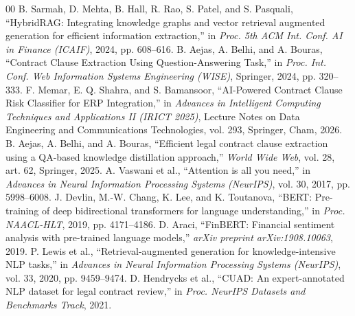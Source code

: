 \documentclass[conference]{IEEEtran}
\begin{document}
\begin{thebibliography}{00}
 B. Sarmah, D. Mehta, B. Hall, R. Rao, S. Patel, and S. Pasquali, ``HybridRAG: Integrating knowledge graphs and vector retrieval augmented generation for efficient information extraction,'' in \textit{Proc. 5th ACM Int. Conf. AI in Finance (ICAIF)}, 2024, pp. 608--616.
 B. Aejas, A. Belhi, and A. Bouras, ``Contract Clause Extraction Using Question-Answering Task,'' in \textit{Proc. Int. Conf. Web Information Systems Engineering (WISE)}, Springer, 2024, pp. 320--333.
 F. Memar, E. Q. Shahra, and S. Bamansoor, ``AI-Powered Contract Clause Risk Classifier for ERP Integration,'' in \textit{Advances in Intelligent Computing Techniques and Applications II (IRICT 2025)}, Lecture Notes on Data Engineering and Communications Technologies, vol. 293, Springer, Cham, 2026.
 B. Aejas, A. Belhi, and A. Bouras, ``Efficient legal contract clause extraction using a QA-based knowledge distillation approach,'' \textit{World Wide Web}, vol. 28, art. 62, Springer, 2025.
 A. Vaswani et al., ``Attention is all you need,'' in \textit{Advances in Neural Information Processing Systems (NeurIPS)}, vol. 30, 2017, pp. 5998--6008.
 J. Devlin, M.-W. Chang, K. Lee, and K. Toutanova, ``BERT: Pre-training of deep bidirectional transformers for language understanding,'' in \textit{Proc. NAACL-HLT}, 2019, pp. 4171--4186.
 D. Araci, ``FinBERT: Financial sentiment analysis with pre-trained language models,'' \textit{arXiv preprint arXiv:1908.10063}, 2019.
 P. Lewis et al., ``Retrieval-augmented generation for knowledge-intensive NLP tasks,'' in \textit{Advances in Neural Information Processing Systems (NeurIPS)}, vol. 33, 2020, pp. 9459--9474.
 D. Hendrycks et al., ``CUAD: An expert-annotated NLP dataset for legal contract review,'' in \textit{Proc. NeurIPS Datasets and Benchmarks Track}, 2021.
\end{thebibliography}
\end{document}
